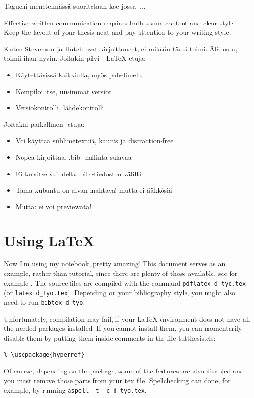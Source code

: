 \documentclass[12pt,a4paper,finnish]{tutthesis}
\begin{document}
Taguchi-menetelmässä suoritetaan koe jossa ....


Effective written communication requires both sound content and clear
style. Keep the layout of your thesis neat and pay attention to your
writing style.

Kuten Stevenson ja Hutch \parencite{rubberwheel} ovat kirjoittaneet,
ei mikään tässä toimi. Älä usko, toimii ihan hyvin. Joitakin pilvi - \LaTeX
etuja:
\begin{itemize}
\item Käytettävissä kaikkialla, myös puhelimella
\item Kompiloi itse, uusimmat versiot
\item Versiokontrolli, lähdekontrolli
\end{itemize}

Joitakin paikallinen \LaTeXe -etuja:
\begin{itemize}
\item Voi käyttää sublimetext:iä, kaunis ja distraction-free
\item Nopea kirjoittaa, .bib -hallinta sulavaa
\item Ei tarvitse vaihdella .bib -tiedoston välillä
\item Tama xubuntu on aivan mahtava! mutta ei \"a\"akk\"osi\"a
\item Mutta: ei voi previewata!
\end{itemize}
\section{Using LaTeX}

Now I'm using my notebook, pretty amazing!
This document serves as an example, rather than tutorial, since there
are plenty of those available, see for example 
\cite{mittelbach04,oetiker14, latex13}. The source files are compiled
with the command \texttt{pdflatex d\_tyo.tex} (or \texttt{latex
  d\_tyo.tex}). Depending on your bibliography style, you might also
need to run \texttt{bibtex d\_tyo}.

Unfortunately, compilation may fail, if your LaTeX environment does
not have all the needed packages installed. If you cannot install
them, you can momentarily disable them by putting them inside comments
in the file tutthesis.cls:
\begin{center}
\texttt{\% \textbackslash usepackage\{hyperref\}}
\end{center}
Of course, depending on the package, some of the features are also
disabled and you must remove those parts from your tex file.
Spellchecking can done, for example, by running 
\texttt{aspell -t -c d\_tyo.tex}.
\end{document}
